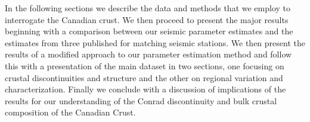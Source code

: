 \documentclass[draft, 12pt]{article}
\begin{document}
In the following sections we describe the data and methods that we employ to interrogate the Canadian crust. We then proceed to present the major results beginning with a comparison between our seismic parameter estimates and the estimates from three published for matching seismic stations. We then present the results of a modified approach to our parameter estimation method and follow this with a presentation of the main dataset in two sections, one focusing on crustal discontinuities and structure and the other on regional variation and characterization. Finally we conclude with a discussion of implications of the results for our understanding of the Conrad discontinuity and bulk crustal composition of the Canadian Crust.

\end{document}
